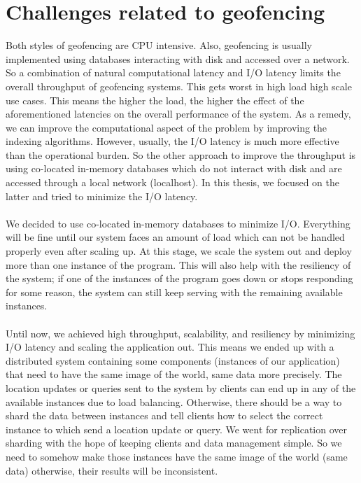 \documentclass[a4]{report}
\begin{document}
    \section{Challenges related to geofencing}
    Both styles of geofencing are CPU intensive.
    Also, geofencing is usually implemented using databases interacting with disk and accessed over a network.
    So a combination of natural computational latency and I/O latency limits the overall throughput of geofencing systems.
    This gets worst in high load high scale use cases.
    This means the higher the load, the higher the effect of the aforementioned latencies on the overall performance of the system.
    As a remedy, we can improve the computational aspect of the problem by improving the indexing algorithms.
    However, usually, the I/O latency is much more effective than the operational burden.
    So the other approach to improve the throughput is using co-located in-memory databases which do not interact with disk and are accessed through a local network (localhost).
    In this thesis, we focused on the latter and tried to minimize the I/O latency.

    \paragraph{}
    We decided to use co-located in-memory databases to minimize I/O.
    Everything will be fine until our system faces an amount of load which can not be handled properly even after scaling up.
    At this stage, we scale the system out and deploy more than one instance of the program.
    This will also help with the resiliency of the system;
    if one of the instances of the program goes down or stops responding for some reason, the system can still keep serving with the remaining available instances.

    \paragraph{}
    Until now, we achieved high throughput, scalability, and resiliency by minimizing I/O latency and scaling the
    application out.
    This means we ended up with a distributed system containing some components (instances of our application) that
    need to have the same image of the world, same data more precisely.
    The location updates or queries sent to the system by clients can end up in any of the available instances due
    to load balancing.
    Otherwise, there should be a way to shard the data between instances and tell clients how to select the correct
    instance to which send a location update or query.
    We went for replication over sharding with the hope of keeping clients and data management simple.
    So we need to somehow make those instances have the same image of the world (same data) otherwise, their results will be inconsistent.
\end{document}
